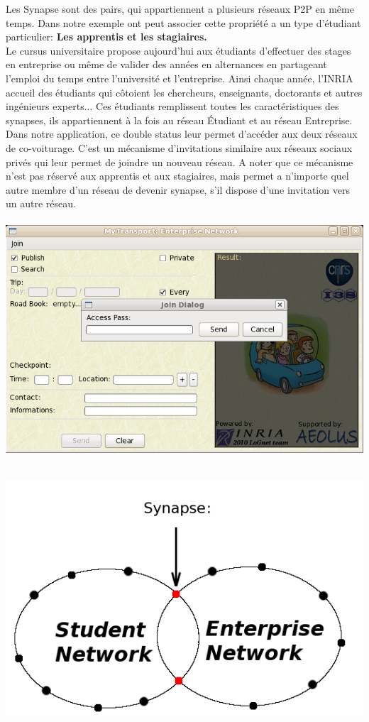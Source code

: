 Les Synapse sont des pairs, qui appartiennent a plusieurs réseaux P2P en même temps. Dans notre exemple ont peut associer cette propriété a un type d'étudiant particulier: \textbf{Les apprentis et les stagiaires.} \\

Le cursus universitaire propose aujourd'hui aux étudiants d'effectuer des stages en entreprise ou même de valider des années en alternances en partageant l'emploi du temps entre l'université et l'entreprise. Ainsi chaque année, l'INRIA accueil des étudiants qui côtoient les chercheurs, enseignants, doctorants et autres ingénieurs experts... 
Ces étudiants remplissent toutes les caractéristiques des synapses, ils appartiennent à la fois au réseau Étudiant et au réseau Entreprise. Dans notre application, ce double status leur permet d'accéder aux deux réseaux de co-voiturage. C'est un mécanisme d'invitations similaire aux réseaux sociaux privés qui leur permet de joindre un nouveau réseau. A noter que ce mécanisme n'est pas réservé aux apprentis et aux stagiaires, mais permet a n'importe quel autre membre d'un réseau de devenir synapse, s'il dispose d'une invitation vers un autre réseau.\\

~ \includegraphics[scale=0.55]{img/screenshot/EnterpriseJoinStudent}

~~~~~~~~~~~~~~~~~~~~~~~~~~~~~ \includegraphics[scale=0.4]{img/schema/Synapse}\\

